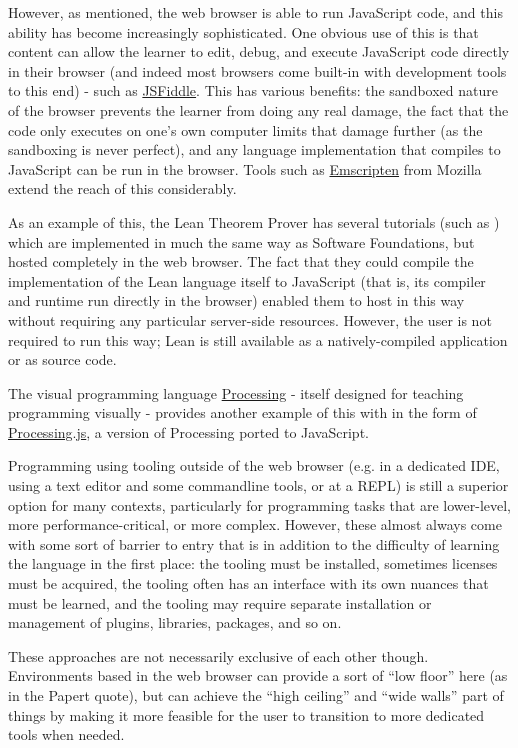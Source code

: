 \documentclass{sig-alternate-05-2015}
\begin{document}
However, as mentioned, the web browser is able to run JavaScript code,
and this ability has become increasingly sophisticated.  One obvious
use of this is that content can allow the learner to edit, debug, and
execute JavaScript code directly in their browser (and indeed most
browsers come built-in with development tools to this end) - such as
\href{https://jsfiddle.net/}{JSFiddle}.  This has various benefits:
the sandboxed nature of the browser prevents the learner from doing
any real damage, the fact that the code only executes on one's own
computer limits that damage further (as the sandboxing is never
perfect), and any language implementation that compiles to JavaScript
can be run in the browser.  Tools such as
\href{http://emscripten.org/}{Emscripten} from Mozilla extend the
reach of this considerably.

As an example of this, the Lean Theorem Prover has several tutorials
(such as \cite{LeanIntro}) which are implemented in much the same way
as Software Foundations, but hosted completely in the web browser.
The fact that they could compile the implementation of the Lean
language itself to JavaScript (that is, its compiler and runtime run
directly in the browser) enabled them to host in this way without
requiring any particular server-side resources.  However, the user is
not required to run this way; Lean is still available as a
natively-compiled application or as source code.

The visual programming language
\href{https://processing.org/}{Processing} - itself designed for
teaching programming visually\cite{P5Design} - provides another
example of this with in the form of
\href{https://processingjs.org/}{Processing.js}, a version of
Processing ported to JavaScript.

Programming using tooling outside of the web browser (e.g. in a
dedicated IDE, using a text editor and some commandline tools, or at a
REPL) is still a superior option for many contexts, particularly for
programming tasks that are lower-level, more performance-critical, or
more complex.  However, these almost always come with some sort of
barrier to entry that is in addition to the difficulty of learning the
language in the first place: the tooling must be installed, sometimes
licenses must be acquired, the tooling often has an interface with its
own nuances that must be learned, and the tooling may require separate
installation or management of plugins, libraries, packages, and so on.

These approaches are not necessarily exclusive of each other though.
Environments based in the web browser can provide a sort of ``low
floor'' here (as in the Papert quote), but can achieve the ``high
ceiling'' and ``wide walls'' part of things by making it more feasible
for the user to transition to more dedicated tools when needed.
\end{document}
